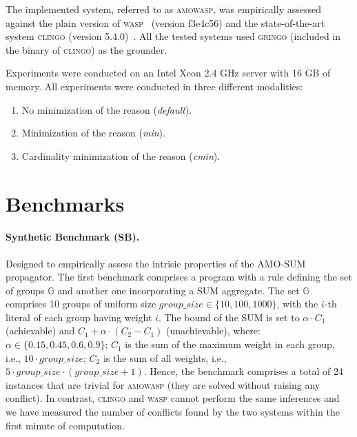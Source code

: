 The implemented system, referred to as \textsc{amowasp}, was empirically assessed against the plain version 
of \textsc{wasp}~\cite{DBLP:conf/lpnmr/AlvianoDLR15} (version f3e4c56) and the state-of-the-art system \textsc{clingo} (version 5.4.0)~\cite{DBLP:conf/iclp/GebserKKOSW16}.
All the tested systems used \textsc{gringo} (included in the binary of \textsc{clingo}) as the grounder.

Experiments were conducted on an Intel Xeon 2.4 GHz server with 16 GB of memory.
All experiments were conducted in three different modalities:
\begin{enumerate}
    \item No minimization of the reason (\textit{default}).
    \item Minimization of the reason (\textit{min}).
    \item Cardinality minimization of the reason (\textit{cmin}).
\end{enumerate}



\section{Benchmarks}

\paragraph{Synthetic Benchmark (SB).}%
Designed to empirically assess the intrisic properties of the AMO-SUM propagator.
The first benchmark comprises a program with a rule defining the set of groups $\mathbb{G}$ and another one incorporating a SUM aggregate.
The set $\mathbb{G}$ comprises 10 groups of uniform size $\mathit{group\_size} \in \{10, 100, 1000\}$, 
with the $i$-th literal of each group having weight $i$.
The bound of the SUM is set to
$\alpha \cdot C_1$ (achievable)
and
$C_1 + \alpha \cdot (C_2 - C_1)$ (unachievable), where:
$\alpha \in \{0.15, 0.45, 0.6, 0.9\}$;
$C_1$ is the sum of the maximum weight in each group, i.e., $10 \cdot \mathit{group\_size}$;
$C_2$ is the sum of all weights, i.e., $5 \cdot \mathit{group\_size} \cdot (\mathit{group\_size} + 1)$.
Hence, the benchmark comprises a total of 24 instances that are trivial for \textsc{amowasp} 
(they are solved without raising any conflict).
In contrast, \textsc{clingo} and \textsc{wasp} cannot perform the same inferences
and we have measured the number of conflicts found by the two systems within 
the first minute of computation.

